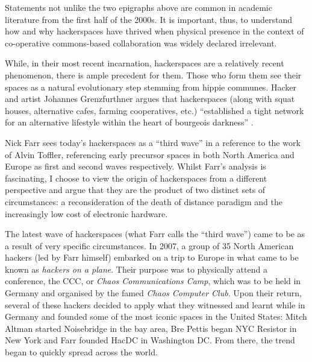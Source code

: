 \begin{epigraphs}

\end{epigraphs}

Statements not unlike the two epigraphs above are common in academic literature from the first half of the 2000s. It is important, thus, to understand how and why hackerspaces have thrived when physical presence in the context of co-operative commons-based collaboration was widely declared irrelevant.

While, in their most recent incarnation, hackerspaces are a relatively recent phenomenon, there is ample precedent for them. Those who form them see their spaces as a natural evolutionary step stemming from hippie communes. Hacker and artist Johannes Grenzfurthner argues that hackerspaces (along with squat houses, alternative cafes, farming cooperatives, etc.) ``established a tight network for an alternative lifestyle within the heart of bourgeois darkness'' \citep{grenzfurthner09}.

Nick Farr sees today's hackerspaces as a ``third wave'' in a reference to the work of Alvin Toffler, referencing early precursor spaces in both North America and Europe as first and second waves respectively. Whilst Farr's analysis is fascinating, I choose to view the origin of hackerspaces from a different perspective and argue that they are the product of two distinct sets of circumstances: a reconsideration of the death of distance paradigm and the increasingly low cost of electronic hardware.

The latest wave of hackerspaces (what Farr calls the ``third wave'') came to be as a result of very specific circumstances. In 2007, a group of 35 North American hackers (led by Farr himself) embarked on a trip to Europe in what came to be known as \textit{hackers on a plane}. Their purpose was to physically attend a conference, the CCC, or \textit{Chaos Communications Camp}, which was to be held in Germany and organised by the famed \textit{Chaos Computer Club}. Upon their return, several of these hackers decided to apply what they witnessed and learnt while in Germany and founded some of the most iconic spaces in the United States: Mitch Altman started Noisebridge in the bay area, Bre Pettis began NYC Resistor in New York and Farr founded HacDC in Washington DC. From there, the trend began to quickly spread across the world.

